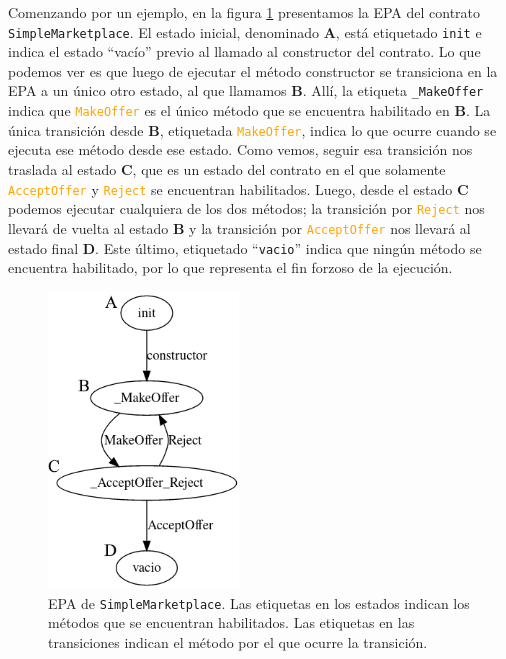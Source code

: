 Comenzando por un ejemplo, en la figura \ref{fig:epa-example} presentamos la EPA del contrato \texttt{Simple\-Marketplace}.
El estado inicial, denominado \textbf{A}, está etiquetado \texttt{init} e indica el estado ``vacío'' previo al llamado al constructor del contrato.
Lo que podemos ver es que luego de ejecutar el método constructor se transiciona en la EPA a un único otro estado, al que llamamos \textbf{B}.
Allí, la etiqueta \texttt{\_MakeOffer} indica que \textcolor{orange}{\texttt{MakeOffer}} es el único método que se encuentra habilitado en \textbf{B}.
La única transición desde \textbf{B}, etiquetada \textcolor{orange}{\texttt{MakeOffer}}, indica lo que ocurre cuando se ejecuta ese método desde ese estado. Como vemos, seguir esa transición nos traslada  al estado \textbf{C}, que es un estado del contrato en el que solamente \textcolor{orange}{\texttt{AcceptOffer}} y \textcolor{orange}{\texttt{Reject}} se encuentran habilitados.
Luego, desde el estado \textbf{C} podemos ejecutar cualquiera de los dos métodos; la transición por \textcolor{orange}{\texttt{Reject}} nos llevará de vuelta al estado \textbf{B} y la transición por \textcolor{orange}{\texttt{AcceptOffer}} nos llevará al estado final \textbf{D}.
Este último, etiquetado ``\texttt{vacio}'' indica que ningún método se encuentra habilitado, por lo que representa el fin forzoso de la ejecución.



\begin{figure}
    \centering
    \includegraphics[width=0.45\textwidth]{figs/simple-merketplace-epa.png}
    \caption{EPA de \texttt{SimpleMarketplace}. Las etiquetas en los estados indican los métodos que se encuentran habilitados. Las etiquetas en las transiciones indican el método por el que ocurre la transición.}
    \label{fig:epa-example}
\end{figure}

